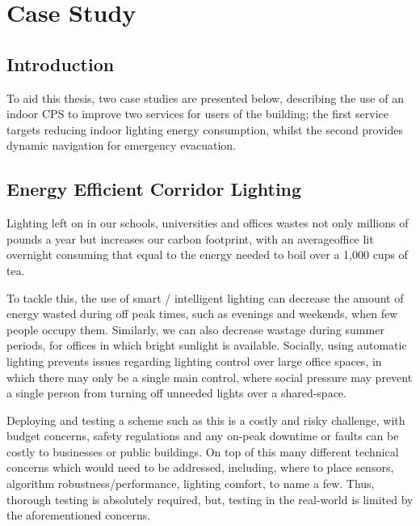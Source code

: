 \chapter{Case Study}
\label{chap:Case Study}
\section{Introduction}
\label{sec:Introduction}
To aid this thesis, two case studies are presented below, describing the use of an indoor CPS to improve two services for users of the building; the first service targets reducing indoor lighting energy consumption, whilst the second provides dynamic navigation for emergency evacuation.

\section{Energy Efficient Corridor Lighting}
Lighting left on in our schools, universities and offices wastes not only millions of pounds a year but increases our carbon footprint, with an average\footnotemark office lit overnight consuming that equal to the energy needed to boil over a 1,000 cups of tea\cite{cambridgeEnergyWaste,carbonTrustEnergyWaste}.

To tackle this, the use of smart / intelligent lighting can decrease the amount of energy wasted during off peak times, such as evenings and weekends, when few people occupy them. Similarly, we can also decrease wastage during summer periods, for offices in which bright sunlight is available. Socially, using automatic lighting prevents issues regarding lighting control over large office spaces, in which there may only be a single main control, where social pressure may prevent a single person from turning off unneeded lights over a shared-space.

Deploying and testing a scheme such as this is a costly and risky challenge, with budget concerns, safety regulations and any on-peak downtime or faults can be costly to businesses or public buildings. On top of this many different technical concerns which would need to be addressed, including, where to place sensors, algorithm robustness/performance, lighting comfort, to name a few. Thus, thorough testing is absolutely required, but, testing in the real-world is limited by the aforementioned concerns. 



